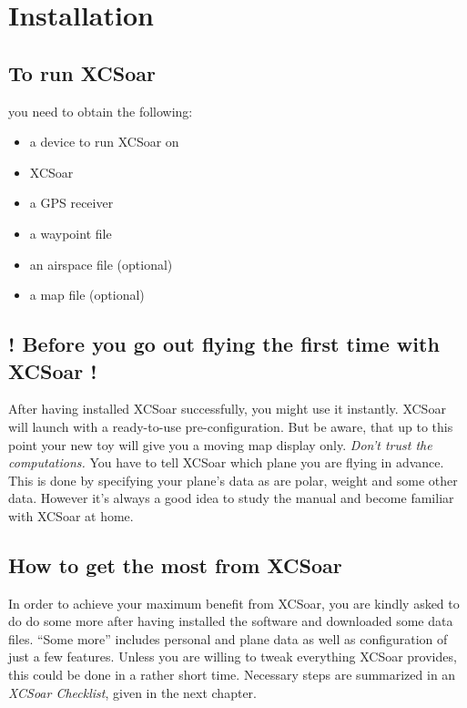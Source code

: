 \chapter{Installation}\label{cha:installation}

\section{To run XCSoar}
 you need to obtain the following:

\begin{itemize}
\itemsep0em
\item a device to run XCSoar on
\item XCSoar
\item a GPS receiver
\item a waypoint file
\item an airspace file (optional)
\item a map file (optional)
\end{itemize}

\section{! Before you go out flying the first time with XCSoar !}

After having installed XCSoar successfully, you might use it instantly. XCSoar 
will launch with a ready-to-use pre-configuration. But be aware, that up to 
this point your new toy will give you a moving map display only.
\warning \emph{Don't trust the computations.} You have to tell XCSoar which 
plane you are flying in advance.  This is done by specifying your plane's data 
as are polar, weight and some other data.  However it's always a good idea to 
study the manual and become familiar with XCSoar at home.

\section{How to get the most from XCSoar}

In order to achieve your maximum benefit from XCSoar, you are kindly asked to 
do do some more after having installed the software and downloaded some data 
files. ``Some more'' includes personal and plane data as well as configuration 
of just a few features. Unless you are willing to tweak everything XCSoar 
provides, this could be done in a rather short time. Necessary steps are 
summarized in an \emph{XCSoar Checklist}, given in the next chapter.

